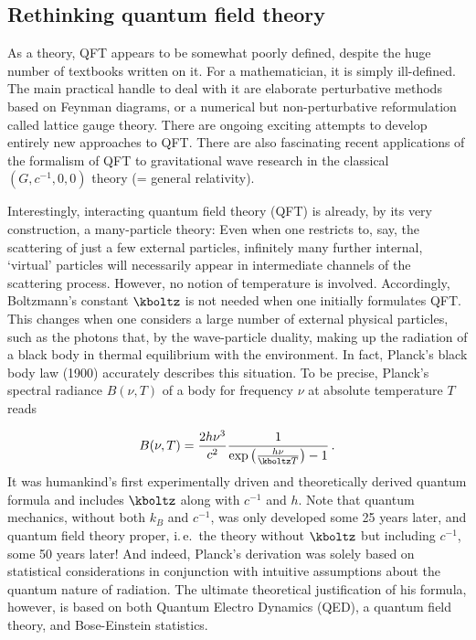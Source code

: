 \documentclass{scrartcl}
\begin{document}
\subsection*{Rethinking quantum field theory}

As a theory, QFT appears to be somewhat poorly defined, despite the huge number of textbooks written on it. For a mathematician, it is simply ill-defined. The main practical handle to deal with it are elaborate perturbative methods based on Feynman diagrams, or a numerical but non-perturbative reformulation called lattice gauge theory. There are ongoing exciting attempts to develop entirely new approaches to QFT. There are also fascinating recent applications of the formalism of QFT to gravitational wave research in the classical $(G,c^{-1},0,0)$ theory (= general relativity).



\newpage {}
\label{sec:0111}

Interestingly, interacting quantum field theory (QFT) is already, by its very construction, a many-particle theory: Even when one restricts to, say, the scattering of just a few external particles, infinitely many further internal, \enquote*{virtual} particles will necessarily appear in intermediate channels of the scattering process. However, no notion of temperature is involved. Accordingly, Boltzmann's constant $\kboltz$ is not needed when one initially formulates QFT. This changes when one considers a large number of external physical particles, such as the photons that, by the wave-particle duality, making up the radiation of a black body in thermal equilibrium with the environment. In fact, Planck's black body law (1900) accurately describes this situation. To be precise, Planck's spectral radiance $B(\nu,T)$ of a body for frequency $\nu$ at absolute temperature $T$ reads

\begin{equation*}
  B(\nu,T)=\frac{2 h \nu^3}{c^2} \frac{1}{\exp\left(\frac{h \nu}{\kboltz T}\right)-1}\,.
\end{equation*}
%
It was humankind's first experimentally driven and theoretically derived quantum formula and includes $\kboltz$ along with $c^{-1}$ and $h$. Note that quantum mechanics, without both $k_B$ and $c^{-1}$, was only developed some 25 years later, and quantum field theory proper, i.\,e.\ the theory without $\kboltz$ but including $c^{-1}$, some 50 years later! And indeed, Planck's derivation was solely based on statistical considerations in conjunction with intuitive assumptions about the quantum nature of radiation. The ultimate theoretical justification of his formula, however, is based on both Quantum Electro Dynamics (QED), a quantum field theory, and Bose-Einstein statistics.
\end{document}
